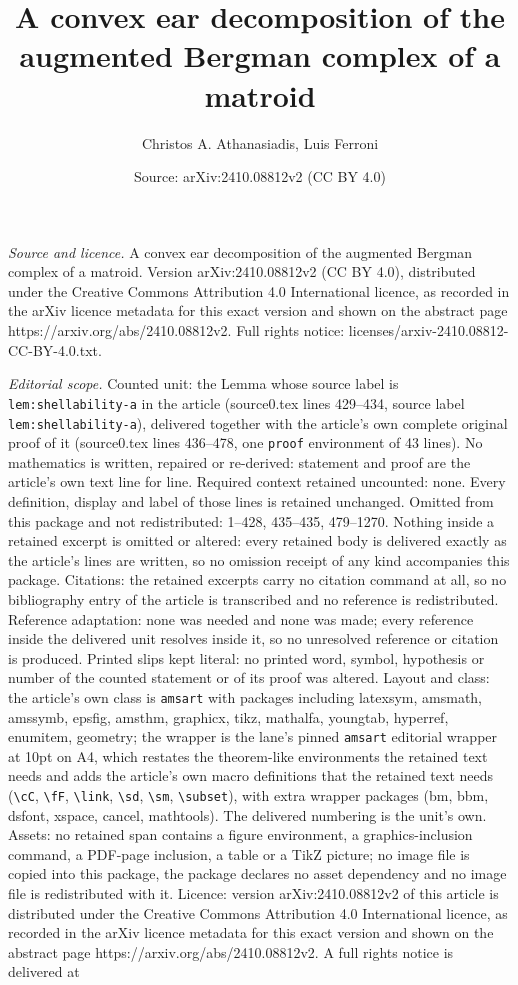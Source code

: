 \documentclass[10pt,a4paper]{amsart}
\title[A convex ear decomposition of the augmented Bergman complex ]{A convex ear decomposition of the augmented Bergman complex of a matroid}
\author{Christos A. Athanasiadis, Luis Ferroni}
\date{Source: arXiv:2410.08812v2 (CC BY 4.0)}
\begin{document}
\maketitle

\noindent\emph{Source and licence.} A convex ear decomposition of the augmented Bergman complex of a matroid. Version arXiv:2410.08812v2 (CC BY 4.0), distributed under the Creative Commons Attribution 4.0 International licence, as recorded in the arXiv licence metadata for this exact version and shown on the abstract page https://arxiv.org/abs/2410.08812v2. Full rights notice: licenses/arxiv-2410.08812-CC-BY-4.0.txt.\par\smallskip

\noindent\textit{Editorial scope.} Counted unit: the Lemma whose source label is \texttt{lem:shellability-a} in the article (source0.tex lines 429--434, source label \texttt{lem:shellability-a}), delivered together with the article's own complete original proof of it (source0.tex lines 436--478, one \texttt{proof} environment of 43 lines). No mathematics is written, repaired or re-derived: statement and proof are the article's own text line for line. Required context retained uncounted: none. Every definition, display and label of those lines is retained unchanged. Omitted from this package and not redistributed: 1--428, 435--435, 479--1270. Nothing inside a retained excerpt is omitted or altered: every retained body is delivered exactly as the article's lines are written, so no omission receipt of any kind accompanies this package. Citations: the retained excerpts carry no citation command at all, so no bibliography entry of the article is transcribed and no reference is redistributed. Reference adaptation: none was needed and none was made; every reference inside the delivered unit resolves inside it, so no unresolved reference or citation is produced. Printed slips kept literal: no printed word, symbol, hypothesis or number of the counted statement or of its proof was altered. Layout and class: the article's own class is \texttt{amsart} with packages including latexsym, amsmath, amssymb, epsfig, amsthm, graphicx, tikz, mathalfa, youngtab, hyperref, enumitem, geometry; the wrapper is the lane's pinned \texttt{amsart} editorial wrapper at 10pt on A4, which restates the theorem-like environments the retained text needs and adds the article's own macro definitions that the retained text needs (\texttt{\textbackslash cC}, \texttt{\textbackslash fF}, \texttt{\textbackslash link}, \texttt{\textbackslash sd}, \texttt{\textbackslash sm}, \texttt{\textbackslash subset}), with extra wrapper packages (bm, bbm, dsfont, xspace, cancel, mathtools). The delivered numbering is the unit's own. Assets: no retained span contains a figure environment, a graphics-inclusion command, a PDF-page inclusion, a table or a TikZ picture; no image file is copied into this package, the package declares no asset dependency and no image file is redistributed with it. Licence: version arXiv:2410.08812v2 of this article is distributed under the Creative Commons Attribution 4.0 International licence, as recorded in the arXiv licence metadata for this exact version and shown on the abstract page https://arxiv.org/abs/2410.08812v2. A full rights notice is delivered at 
\end{document}
